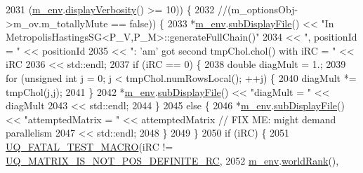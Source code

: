 \begin{DoxyCode}
{{2031               (\hyperlink{class_q_u_e_s_o_1_1_metropolis_hastings_s_g_ac8ea061e55b920e0c8f9bce5c3f20e52}{m\_env}.\hyperlink{class_q_u_e_s_o_1_1_base_environment_a1fe5f244fc0316a0ab3e37463f108b96}{displayVerbosity}() >= 10)) \{
2032       \textcolor{comment}{//(m\_optionsObj->m\_ov.m\_totallyMute == false)) \{}
2033             *\hyperlink{class_q_u_e_s_o_1_1_metropolis_hastings_s_g_ac8ea061e55b920e0c8f9bce5c3f20e52}{m\_env}.\hyperlink{class_q_u_e_s_o_1_1_base_environment_a8a0064746ae8dddfece4229b9ad374d6}{subDisplayFile}() << \textcolor{stringliteral}{"In
       MetropolisHastingsSG<P\_V,P\_M>::generateFullChain()"}
2034                                     << \textcolor{stringliteral}{", positionId = "} << positionId
2035                                     << \textcolor{stringliteral}{": 'am' got second tmpChol.chol() with iRC = "} << iRC
2036                                     << std::endl;
2037             \textcolor{keywordflow}{if} (iRC == 0) \{
2038               \textcolor{keywordtype}{double} diagMult = 1.;
2039               \textcolor{keywordflow}{for} (\textcolor{keywordtype}{unsigned} \textcolor{keywordtype}{int} j = 0; j < tmpChol.numRowsLocal(); ++j) \{
2040                 diagMult *= tmpChol(j,j);
2041               \}
2042               *\hyperlink{class_q_u_e_s_o_1_1_metropolis_hastings_s_g_ac8ea061e55b920e0c8f9bce5c3f20e52}{m\_env}.\hyperlink{class_q_u_e_s_o_1_1_base_environment_a8a0064746ae8dddfece4229b9ad374d6}{subDisplayFile}() << \textcolor{stringliteral}{"diagMult = "} << diagMult
2043                                       << std::endl;
2044             \}
2045             \textcolor{keywordflow}{else} \{
2046               *\hyperlink{class_q_u_e_s_o_1_1_metropolis_hastings_s_g_ac8ea061e55b920e0c8f9bce5c3f20e52}{m\_env}.\hyperlink{class_q_u_e_s_o_1_1_base_environment_a8a0064746ae8dddfece4229b9ad374d6}{subDisplayFile}() << \textcolor{stringliteral}{"attemptedMatrix = "} << attemptedMatrix \textcolor{comment}{// FIX
       ME: might demand parallelism}
2047                                       << std::endl;
2048             \}
2049           \}
2050           \textcolor{keywordflow}{if} (iRC) \{
2051             \hyperlink{_defines_8h_a56d63d18d0a6d45757de47fcc06f574d}{UQ\_FATAL\_TEST\_MACRO}(iRC != 
      \hyperlink{namespace_q_u_e_s_o_a677863cd32092584175760250f39e8bb}{UQ\_MATRIX\_IS\_NOT\_POS\_DEFINITE\_RC},
2052                                 \hyperlink{class_q_u_e_s_o_1_1_metropolis_hastings_s_g_ac8ea061e55b920e0c8f9bce5c3f20e52}{m\_env}.\hyperlink{class_q_u_e_s_o_1_1_base_environment_a78b57112bbd0e6dd0e8afec00b40ffa7}{worldRank}(),
}}
\end{DoxyCode}
